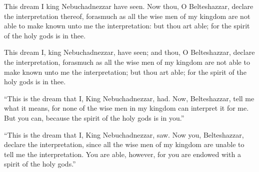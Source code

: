 			This dream I king Nebuchadnezzar have seen. Now thou, O Belteshazzar, declare the interpretation thereof, forasmuch as all the wise men of my kingdom are not able to make known unto me the interpretation: but thou art able; for the spirit of the holy gods is in thee.

			\begin{versebox}
					\item[BHS] 
					\item[LXX] 
					\item[ASV] This dream I, king Nebuchadnezzar, have seen; and thou, O Belteshazzar, declare the interpretation, forasmuch as all the wise men of my kingdom are not able to make known unto me the interpretation; but thou art able; for the spirit of the holy gods is in thee.
					\item[NIV] “This is the dream that I, King Nebuchadnezzar, had. Now, Belteshazzar, tell me what it means, for none of the wise men in my kingdom can interpret it for me. But you can, because the spirit of the holy gods is in you.”
					\item[NRSV] “This is the dream that I, King Nebuchadnezzar, saw. Now you, Belteshazzar, declare the interpretation, since all the wise men of my kingdom are unable to tell me the interpretation. You are able, however, for you are endowed with a spirit of the holy gods.”
			\end{versebox}

